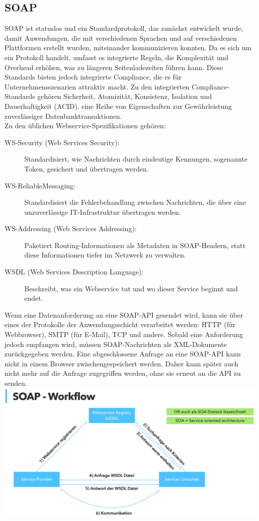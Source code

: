 \documentclass[12pt,a4paper]{article}
\begin{document}
\subsection{SOAP}
SOAP ist statuslos und ein Standardprotokoll, das zunächst entwickelt wurde, damit Anwendungen, die mit verschiedenen Sprachen und auf verschiedenen Plattformen erstellt wurden, miteinander kommunizieren konnten. Da es sich um ein Protokoll handelt, umfasst es integrierte Regeln, die Komplexität und Overhead erhöhen, was zu längeren Seitenladezeiten führen kann. Diese Standards bieten jedoch integrierte Compliance, die es für Unternehmensszenarien attraktiv macht. Zu den integrierten Compliance-Standards gehören Sicherheit, Atomizität, Konsistenz, Isolation und Dauerhaftigkeit (ACID), eine Reihe von Eigenschaften zur Gewährleistung zuverlässiger Datenbanktransaktionen.\\
Zu den üblichen Webservice-Spezifikationen gehören:\\
\begin{description}
	\item[WS-Security (Web Services Security):] Standardisiert, wie Nachrichten durch eindeutige Kennungen, sogenannte Token, gesichert und übertragen werden.
	\item[WS-ReliableMessaging:] Standardisiert die Fehlerbehandlung zwischen Nachrichten, die über eine unzuverlässige IT-Infrastruktur übertragen werden.
	\item[WS-Addressing (Web Services Addressing):] Paketiert Routing-Informationen als Metadaten in SOAP-Headern, statt diese Informationen tiefer im Netzwerk zu verwalten.
	\item[WSDL (Web Services Description Language):] Beschreibt, was ein Webservice tut und wo dieser Service beginnt und endet.
\end{description}
Wenn eine Datenanforderung an eine SOAP-API gesendet wird, kann sie über eines der Protokolle der Anwendungsschicht verarbeitet werden: HTTP (für Webbrowser), SMTP (für E-Mail), TCP und andere. Sobald eine Anforderung jedoch empfangen wird, müssen SOAP-Nachrichten als XML-Dokumente zurückgegeben werden. Eine abgeschlossene Anfrage an eine SOAP-API kann nicht in einem Browser zwischengespeichert werden. Daher kann später auch nicht mehr auf die Anfrage zugegriffen werden, ohne sie erneut an die API zu senden.\\
\includegraphics[width=\textwidth]{Bilder/soap_workflow.PNG}
\end{document}
